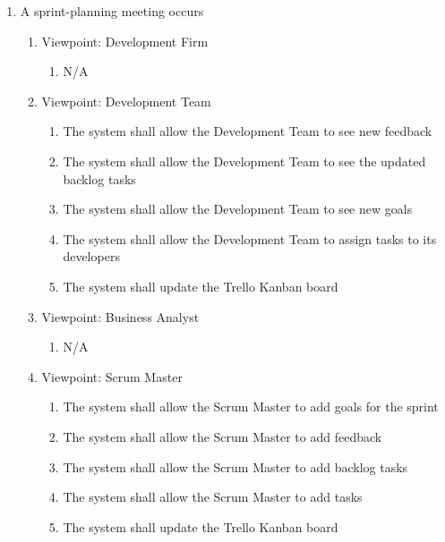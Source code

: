 \documentclass[12pt, titlepage]{article}
\begin{document}
\begin{enumerate}[{BE}1.]
    \item A sprint-planning meeting occurs %
    \begin{enumerate}[{VP}1.] 
        \item Viewpoint: Development Firm
            \begin{enumerate}
                \item[] N/A
            \end{enumerate}
        \item Viewpoint: Development Team
            \begin{enumerate}
                \item The system shall allow the Development Team to see new feedback
                \item The system shall allow the Development Team to see the updated backlog tasks
                \item The system shall allow the Development Team to see new goals
                \item The system shall allow the Development Team to assign tasks to its developers
                \item The system shall update the Trello Kanban board
            \end{enumerate}
        \item Viewpoint: Business Analyst
            \begin{enumerate}
                \item[] N/A
            \end{enumerate}
        \item Viewpoint: Scrum Master
            \begin{enumerate}
                \item The system shall allow the Scrum Master to add goals for the sprint
                \item The system shall allow the Scrum Master to add feedback
                \item The system shall allow the Scrum Master to add backlog tasks
                \item The system shall allow the Scrum Master to add tasks
                \item The system shall update the Trello Kanban board
            \end{enumerate}
    \end{enumerate}


\end{enumerate}
\end{document}
